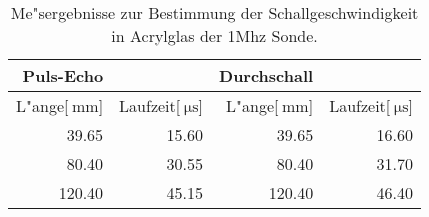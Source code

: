 \begin{table}[!h]
\begin{center}
\begin{tabular}{|r|r|r|r|}
\hline
Puls-Echo & & Durchschall & \\
\hline
\hline
 L"ange[$\SI{}{\milli\meter}$] & Laufzeit[$\SI{}{\micro\second}$] & L"ange[$\SI{}{\milli\meter}$] & Laufzeit[$\SI{}{\micro\second}$]\\
\hline
\hline
 39.65 &	15.60 &	 39.65 &	16.60\\
 80.40 &	30.55 &	 80.40 &	31.70\\
120.40 &	45.15 &	120.40 &	46.40\\
\hline
\end{tabular}
\caption[]{Me"sergebnisse zur Bestimmung der Schallgeschwindigkeit in Acrylglas der 1Mhz Sonde.}
\label{a1}
\end{center}
\end{table}